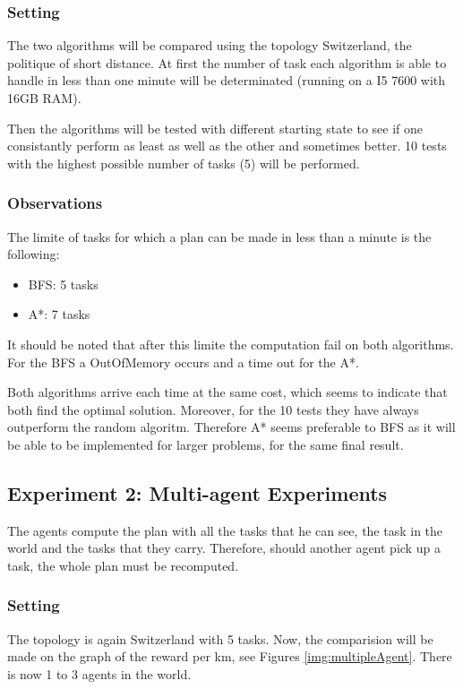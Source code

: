 \documentclass[11pt]{article}
\begin{document}
\subsubsection{Setting}
The two algorithms will be compared using the topology Switzerland, the politique of short distance. At first the number of task each algorithm is able to handle in less than one minute will be determinated (running on a I5 7600 with 16GB RAM).

Then the algorithms will be tested with different starting state to see if one consistantly perform as least as well as the other and sometimes better. 10 tests with the highest possible number of tasks (5) will be performed. 
\subsubsection{Observations}
The limite of tasks for which a plan can be made in less than a minute is the following:
\begin{itemize}
  \item BFS: 5 tasks
  \item A*: 7 tasks
\end{itemize}
It should be noted that after this limite the computation fail on both algorithms. For the BFS a OutOfMemory occurs and a time out for the A*.

Both algorithms arrive each time at the same cost, which seems to indicate that both find the optimal solution. Moreover, for the 10 tests they have always outperform the random algoritm. Therefore A* seems preferable to BFS as it will be able to be implemented for larger problems, for the same final result.

\subsection{Experiment 2: Multi-agent Experiments}
The agents compute the plan with all the tasks that he can see, the task in the world and the tasks that they carry. Therefore, should another agent pick up a task, the whole plan must be recomputed.  
\subsubsection{Setting}
The topology is again Switzerland with 5 tasks. Now, the comparision will be made on the graph of the reward per km, see Figures \ref{img:multipleAgent}. There is now 1 to 3 agents in the world. 
\end{document}
